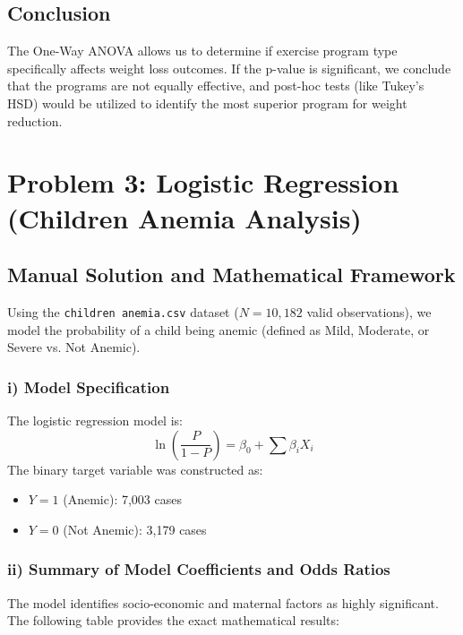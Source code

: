\documentclass[12pt]{article}
\begin{document}
\subsection{Conclusion}
The One-Way ANOVA allows us to determine if exercise program type specifically affects weight loss outcomes. If the p-value is significant, we conclude that the programs are not equally effective, and post-hoc tests (like Tukey's HSD) would be utilized to identify the most superior program for weight reduction.


\newpage
\section{Problem 3: Logistic Regression (Children Anemia Analysis)}
\label{prob3}

\subsection{Manual Solution and Mathematical Framework}
Using the \texttt{children anemia.csv} dataset ($N = 10,182$ valid observations), we model the probability of a child being anemic (defined as Mild, Moderate, or Severe vs. Not Anemic).

\subsubsection{i) Model Specification}
The logistic regression model is:
\[ \ln\left(\frac{P}{1-P}\right) = \beta_0 + \sum \beta_i X_i \]
The binary target variable was constructed as:
\begin{itemize}
    \item $Y=1$ (Anemic): 7,003 cases
    \item $Y=0$ (Not Anemic): 3,179 cases
\end{itemize}

\subsubsection{ii) Summary of Model Coefficients and Odds Ratios}
The model identifies socio-economic and maternal factors as highly significant. The following table provides the exact mathematical results:
\end{document}
